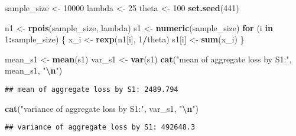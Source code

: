 \documentclass[
]{article}
\newenvironment{Shaded}{\begin{snugshade}}{\end{snugshade}}
\newcommand{\ControlFlowTok}[1]{\textcolor[rgb]{0.13,0.29,0.53}{\textbf{#1}}}
\newcommand{\DecValTok}[1]{\textcolor[rgb]{0.00,0.00,0.81}{#1}}
\newcommand{\FunctionTok}[1]{\textcolor[rgb]{0.13,0.29,0.53}{\textbf{#1}}}
\newcommand{\NormalTok}[1]{#1}
\newcommand{\OtherTok}[1]{\textcolor[rgb]{0.56,0.35,0.01}{#1}}
\newcommand{\SpecialCharTok}[1]{\textcolor[rgb]{0.81,0.36,0.00}{\textbf{#1}}}
\newcommand{\StringTok}[1]{\textcolor[rgb]{0.31,0.60,0.02}{#1}}
\begin{document}
\begin{Shaded}
\begin{Highlighting}[]
\NormalTok{sample\_size }\OtherTok{\textless{}{-}} \DecValTok{10000}
\NormalTok{lambda }\OtherTok{\textless{}{-}} \DecValTok{25}
\NormalTok{theta }\OtherTok{\textless{}{-}} \DecValTok{100}
\FunctionTok{set.seed}\NormalTok{(}\DecValTok{441}\NormalTok{)}

\NormalTok{n1 }\OtherTok{\textless{}{-}} \FunctionTok{rpois}\NormalTok{(sample\_size, lambda)}
\NormalTok{s1 }\OtherTok{\textless{}{-}} \FunctionTok{numeric}\NormalTok{(sample\_size)}
\ControlFlowTok{for}\NormalTok{ (i }\ControlFlowTok{in} \DecValTok{1}\SpecialCharTok{:}\NormalTok{sample\_size) \{}
\NormalTok{  x\_i }\OtherTok{\textless{}{-}} \FunctionTok{rexp}\NormalTok{(n1[i], }\DecValTok{1}\SpecialCharTok{/}\NormalTok{theta) }
\NormalTok{  s1[i] }\OtherTok{\textless{}{-}} \FunctionTok{sum}\NormalTok{(x\_i)}
\NormalTok{\}}

\NormalTok{mean\_s1 }\OtherTok{\textless{}{-}} \FunctionTok{mean}\NormalTok{(s1)}
\NormalTok{var\_s1 }\OtherTok{\textless{}{-}} \FunctionTok{var}\NormalTok{(s1)}
\FunctionTok{cat}\NormalTok{(}\StringTok{"mean of aggregate loss by S1:"}\NormalTok{, mean\_s1, }\StringTok{"}\SpecialCharTok{\textbackslash{}n}\StringTok{"}\NormalTok{)}
\end{Highlighting}
\end{Shaded}

\begin{verbatim}
## mean of aggregate loss by S1: 2489.794
\end{verbatim}

\begin{Shaded}
\begin{Highlighting}[]
\FunctionTok{cat}\NormalTok{(}\StringTok{"variance of aggregate loss by S1:"}\NormalTok{, var\_s1, }\StringTok{"}\SpecialCharTok{\textbackslash{}n}\StringTok{"}\NormalTok{)}
\end{Highlighting}
\end{Shaded}

\begin{verbatim}
## variance of aggregate loss by S1: 492648.3
\end{verbatim}
\end{document}
